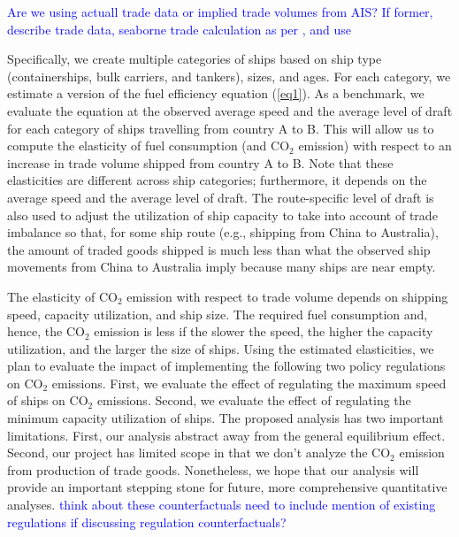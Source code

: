 \documentclass[hidelinks, 12pt,letterpaper]{article}
\begin{document}
\textcolor{blue}{Are we using actuall trade data or implied trade volumes from AIS? If former, describe trade data, seaborne trade calculation as per \citet{wang2021trade}, and use}

Specifically, we create multiple categories of ships based on ship type (containerships, bulk carriers, and tankers), sizes, and ages. For each category, we estimate a version of the fuel efficiency equation (\ref{eq1}). As a benchmark, we evaluate the equation at the observed average speed and the average level of draft for each category of ships travelling from country A to B. This will allow us to compute the elasticity of fuel consumption (and CO$_2$ emission) with respect to an increase in trade volume shipped from country A to  B.  Note that these elasticities are different across ship categories; furthermore, it depends on the average speed and the average level of draft. The route-specific level of draft is also used to adjust the utilization of ship capacity to take into account of trade imbalance so that, for some ship route (e.g., shipping from China to Australia), the amount of traded goods shipped is much less than what the observed ship movements from China to Australia imply because many ships are near empty. 

The elasticity of  CO$_2$ emission with respect to trade volume depends on shipping speed, capacity utilization, and ship size. The required  fuel consumption and, hence, the CO$_2$ emission is less if the slower the speed, the higher the capacity utilization, and the larger the size of ships.  Using the estimated elasticities, we plan to evaluate the impact of implementing  the following two policy regulations on CO$_2$ emissions. First, we evaluate the effect of regulating the maximum speed of ships on CO$_2$ emissions. Second, we evaluate the effect of regulating the minimum capacity utilization of ships. The proposed analysis has two important limitations. First,  our analysis abstract away from the general equilibrium effect. Second, our project has limited scope in that we don't analyze the CO$_2$ emission from production of trade goods. Nonetheless, we hope that our analysis will provide an important stepping stone for future, more comprehensive quantitative analyses. 
\textcolor{blue}{think about these counterfactuals}
\textcolor{blue}{need to include mention of existing regulations if discussing regulation counterfactuals?}
\end{document}
